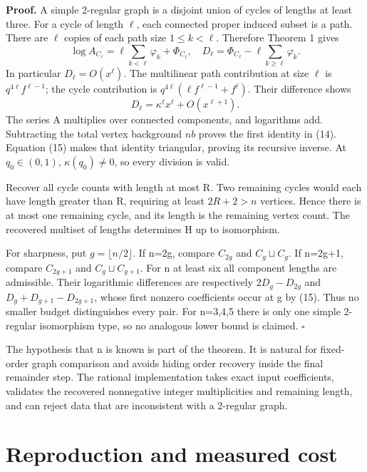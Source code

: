 \documentclass[
  11pt,
  a4paper,
]{article}
\begin{document}
\textbf{Proof.} A simple 2-regular graph is a disjoint union of cycles
of lengths at least three. For a cycle of length \(\ell\), each
connected proper induced subset is a path. There are \(\ell\) copies of
each path size \(1\le k<\ell\). Therefore Theorem 1 gives \[
\log A_{C_\ell}=\ell\sum_{k<\ell}\varphi_k+\Phi_{C_\ell},
\quad
D_\ell=\Phi_{C_\ell}-\ell\sum_{k\ge\ell}\varphi_k.
\] In particular \(D_\ell=O(x^\ell)\). The multilinear path contribution
at size \(\ell\) is \(q^{4\ell}f^{\ell-1}\); the cycle contribution is
\(q^{4\ell}(\ell f^{\ell-1}+f^\ell)\). Their difference shows \[
D_\ell=\kappa^\ell x^\ell+O(x^{\ell+1}).
\tag{15}
\] The series A multiplies over connected components, and logarithms
add. Subtracting the total vertex background \(nb\) proves the first
identity in (14). Equation (15) makes that identity triangular, proving
its recursive inverse. At \(q_0\in(0,1)\), \(\kappa(q_0)\ne0\), so every
division is valid.

Recover all cycle counts with length at most R. Two remaining cycles
would each have length greater than R, requiring at least \(2R+2>n\)
vertices. Hence there is at most one remaining cycle, and its length is
the remaining vertex count. The recovered multiset of lengths determines
H up to isomorphism.

For sharpness, put \(g=\lfloor n/2\rfloor\). If n=2g, compare \(C_{2g}\)
and \(C_g\sqcup C_g\). If n=2g+1, compare \(C_{2g+1}\) and
\(C_g\sqcup C_{g+1}\). For n at least six all component lengths are
admissible. Their logarithmic differences are respectively
\(2D_g-D_{2g}\) and \(D_g+D_{g+1}-D_{2g+1}\), whose first nonzero
coefficients occur at g by (15). Thus no smaller budget distinguishes
every pair. For n=3,4,5 there is only one simple 2-regular isomorphism
type, so no analogous lower bound is claimed. \(\square\)

The hypothesis that n is known is part of the theorem. It is natural for
fixed-order graph comparison and avoids hiding order recovery inside the
final remainder step. The rational implementation takes exact input
coefficients, validates the recovered nonnegative integer multiplicities
and remaining length, and can reject data that are inconsistent with a
2-regular graph.

\hypertarget{reproduction-and-measured-cost}{%
\section{Reproduction and measured
cost}\label{reproduction-and-measured-cost}}
\end{document}
